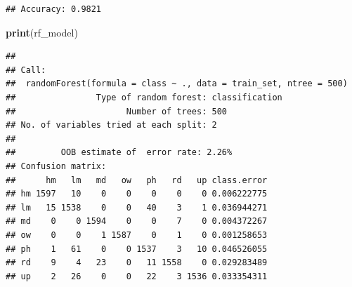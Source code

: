 \documentclass[
]{article}
\newenvironment{Shaded}{\begin{snugshade}}{\end{snugshade}}
\newcommand{\AttributeTok}[1]{\textcolor[rgb]{0.13,0.29,0.53}{#1}}
\newcommand{\CommentTok}[1]{\textcolor[rgb]{0.56,0.35,0.01}{\textit{#1}}}
\newcommand{\DecValTok}[1]{\textcolor[rgb]{0.00,0.00,0.81}{#1}}
\newcommand{\FloatTok}[1]{\textcolor[rgb]{0.00,0.00,0.81}{#1}}
\newcommand{\FunctionTok}[1]{\textcolor[rgb]{0.13,0.29,0.53}{\textbf{#1}}}
\newcommand{\NormalTok}[1]{#1}
\newcommand{\OtherTok}[1]{\textcolor[rgb]{0.56,0.35,0.01}{#1}}
\newcommand{\SpecialCharTok}[1]{\textcolor[rgb]{0.81,0.36,0.00}{\textbf{#1}}}
\newcommand{\StringTok}[1]{\textcolor[rgb]{0.31,0.60,0.02}{#1}}
\begin{document}
\begin{Shaded}
\end{Shaded}

\begin{verbatim}
## Accuracy: 0.9821
\end{verbatim}

\begin{Shaded}
\begin{Highlighting}[]
\FunctionTok{print}\NormalTok{(rf\_model)}
\end{Highlighting}
\end{Shaded}

\begin{verbatim}
## 
## Call:
##  randomForest(formula = class ~ ., data = train_set, ntree = 500) 
##                Type of random forest: classification
##                      Number of trees: 500
## No. of variables tried at each split: 2
## 
##         OOB estimate of  error rate: 2.26%
## Confusion matrix:
##      hm   lm   md   ow   ph   rd   up class.error
## hm 1597   10    0    0    0    0    0 0.006222775
## lm   15 1538    0    0   40    3    1 0.036944271
## md    0    0 1594    0    0    7    0 0.004372267
## ow    0    0    1 1587    0    1    0 0.001258653
## ph    1   61    0    0 1537    3   10 0.046526055
## rd    9    4   23    0   11 1558    0 0.029283489
## up    2   26    0    0   22    3 1536 0.033354311
\end{verbatim}
\end{document}
